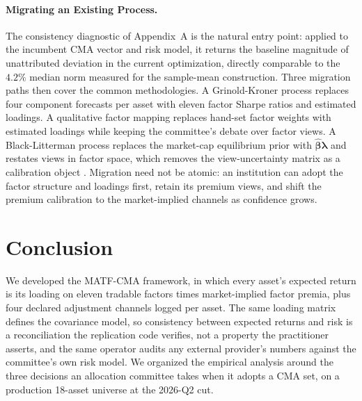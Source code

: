 \documentclass[pdftex,12pt,a4paper]{article}
\begin{document}
\paragraph*{Migrating an Existing Process.} The consistency diagnostic of Appendix~A is the natural entry point: applied to the incumbent CMA vector and risk model, it returns the baseline magnitude of unattributed deviation in the current optimization, directly comparable to the $4.2\%$ median norm measured for the sample-mean construction. Three migration paths then cover the common methodologies. A Grinold-Kroner process replaces four component forecasts per asset with eleven factor Sharpe ratios and estimated loadings. A qualitative factor mapping replaces hand-set factor weights with estimated loadings while keeping the committee's debate over factor views. A Black-Litterman process replaces the market-cap equilibrium prior with $\hat{\boldsymbol\beta}\boldsymbol\lambda$ and restates views in factor space, which removes the view-uncertainty matrix as a calibration object \citep{RoncalliXu2024}. Migration need not be atomic: an institution can adopt the factor structure and loadings first, retain its premium views, and shift the premium calibration to the market-implied channels as confidence grows.

\sectionfont{\MakeUppercase}
\section*{Conclusion}\label{sec:conclusion}

We developed the MATF-CMA framework, in which every asset's expected return is its loading on eleven tradable factors times market-implied factor premia, plus four declared adjustment channels logged per asset. The same loading matrix defines the covariance model, so consistency between expected returns and risk is a reconciliation the replication code verifies, not a property the practitioner asserts, and the same operator audits any external provider's numbers against the committee's own risk model. We organized the empirical analysis around the three decisions an allocation committee takes when it adopts a CMA set, on a production 18-asset universe at the 2026-Q2 cut.
\end{document}
